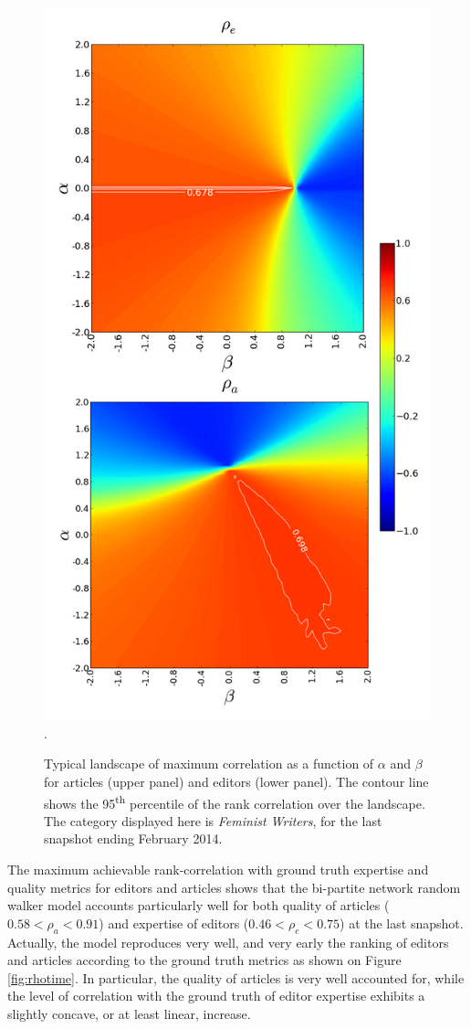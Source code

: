 \begin{figure}[!t]
\centering
\includegraphics[width=0.9\columnwidth]{../Figures/contour_fem_combined.png}.
\caption{Typical landscape of maximum correlation as a function of $\alpha$ and $\beta$ for articles (upper panel) and editors (lower panel). The contour line shows the 95\textsuperscript{th} percentile of the rank correlation over the landscape. The category displayed here is {\it Feminist Writers}, for the last snapshot ending February 2014.}
\label{fig:landscape}
\end{figure}

The maximum achievable rank-correlation with ground truth expertise and quality metrics for editors \cite{geiger2013} and articles \cite{wang2013tell} shows that the bi-partite network random walker model accounts particularly well for both quality of articles ($0.58 < \rho_a < 0.91$) and expertise of editors ($0.46 < \rho_e < 0.75 $) at the last snapshot. Actually, the model reproduces very well, and very early the ranking of editors and articles according to the ground truth metrics as shown on Figure \ref{fig:rhotime}. In particular, the quality of articles is very well accounted for, while the level of correlation with the ground truth of editor expertise exhibits a slightly concave, or at least linear, increase.


